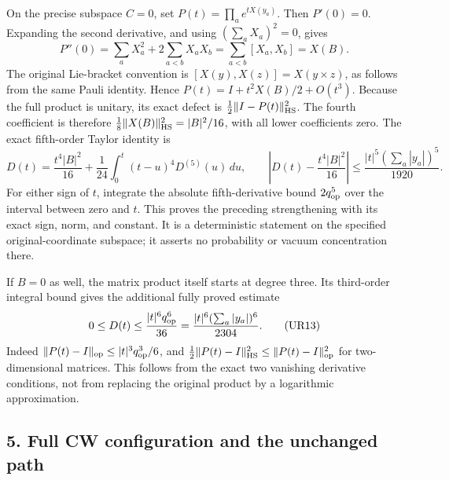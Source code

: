 \documentclass[11pt]{article}
\begin{document}
On the precise subspace \(C=0\), set \(P(t)=\prod_ae^{tX(y_a)}\). Then \(P'(0)=0\). Expanding the second derivative, and using
\((\sum_aX_a)^2=0\), gives
\[
 P''(0)=\sum_aX_a^2+2\sum_{a<b}X_aX_b
       =\sum_{a<b}[X_a,X_b]=X(B).
 \tag{UR11}
\]
The original Lie-bracket convention is \([X(y),X(z)]=X(y\times z)\), as follows from the same Pauli identity. Hence \(P(t)=I+t^2X(B)/2+O(t^3)\). Because the full product is unitary, its exact defect is \(\frac12\|I-P(t)\|_{\rm HS}^2\). The fourth coefficient is therefore
\(\frac18\|X(B)\|_{\rm HS}^2=|B|^2/16\), with all lower coefficients zero. The exact fifth-order Taylor identity is
\[
 D(t)=\frac{t^4|B|^2}{16}
       +\frac1{24}\int_0^t(t-u)^4D^{(5)}(u)\,du,\qquad
 \left|D(t)-\frac{t^4|B|^2}{16}\right|
       \le\frac{|t|^5(\sum_a|y_a|)^5}{1920}.
 \tag{UR12}
\]
For either sign of \(t\), integrate the absolute fifth-derivative bound
\(2q_{\rm op}^5\) over the interval between zero and \(t\). This proves the preceding strengthening with its exact sign, norm, and constant. It is a deterministic statement on the specified original-coordinate subspace; it asserts no probability or vacuum concentration there.

If \(B=0\) as well, the matrix product itself starts at degree three. Its third-order integral bound gives the additional fully proved estimate
\[
 0\le D(t)\le\frac{|t|^6q_{\rm op}^6}{36}
      =\frac{|t|^6(\sum_a|y_a|)^6}{2304}.
 \tag{UR13}
\]
Indeed \(\|P(t)-I\|_{\rm op}\le|t|^3q_{\rm op}^3/6\), and
\(\frac12\|P(t)-I\|_{\rm HS}^2\le\|P(t)-I\|_{\rm op}^2\) for two-dimensional matrices. This follows from the exact two vanishing derivative conditions, not from replacing the original product by a logarithmic approximation.

\subsection*{5. Full CW configuration and the unchanged path}
\end{document}
